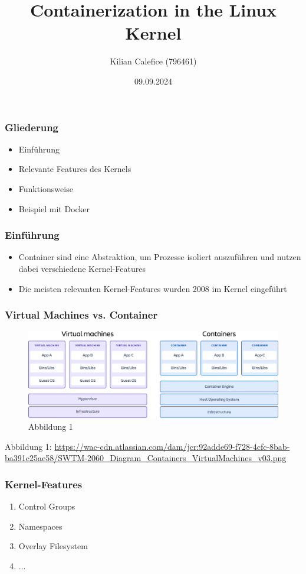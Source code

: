 \documentclass{beamer}
\title{Containerization in the Linux Kernel}
\author{Kilian Calefice (796461)}
\institute{Linux Internals}
\date{09.09.2024}
\begin{document}
\frame{\titlepage}

\begin{frame}
  \frametitle{Gliederung}
  \begin{itemize}
    \item Einführung
    \item Relevante Features des Kernels
    \item Funktionsweise
    \item Beispiel mit Docker
  \end{itemize}
\end{frame}

\begin{frame}
  \frametitle{Einführung}
  \begin{itemize}
    \item Container sind eine Abstraktion, um Prozesse isoliert auszuführen und 
      nutzen dabei verschiedene Kernel-Features
    \item Die meisten relevanten Kernel-Features wurden 2008 im Kernel eingeführt
  \end{itemize}
\end{frame}

\begin{frame}
  \frametitle{Virtual Machines vs. Container}
  \begin{figure}[h]
    \centering
    \includegraphics[width=\linewidth]{container-vs-vm.png}
    \caption*{{\tiny Abbildung 1}}
  \end{figure}
  \vfill
  {\tiny Abbildung 1: \href{https://wac-cdn.atlassian.com/dam/jcr:92adde69-f728-4cfc-8bab-ba391c25ae58/SWTM-2060_Diagram_Containers_VirtualMachines_v03.png}{https://wac-cdn.atlassian.com/dam/jcr:92adde69-f728-4cfc-8bab-ba391c25ae58/SWTM-2060\_Diagram\_Containers\_VirtualMachines\_v03.png}}
\end{frame}

\begin{frame}
  \frametitle{Kernel-Features}
  \begin{enumerate}
    \item Control Groups 
    \item Namespaces
    \item Overlay Filesystem
    \item ...
  \end{enumerate}
\end{frame}
\end{document}
